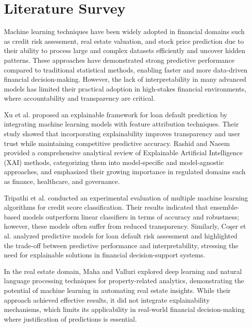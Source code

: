 
\section{Literature Survey}

Machine learning techniques have been widely adopted in financial domains such as credit risk assessment, real estate valuation, and stock price prediction due to their ability to process large and complex datasets efficiently and uncover hidden patterns. These approaches have demonstrated strong predictive performance compared to traditional statistical methods, enabling faster and more data-driven financial decision-making. However, the lack of interpretability in many advanced models has limited their practical adoption in high-stakes financial environments, where accountability and transparency are critical. 

Xu et al. \cite{xu2023} proposed an explainable framework for loan default prediction by integrating machine learning models with feature attribution techniques. Their study showed that incorporating explainability improves transparency and user trust while maintaining competitive predictive accuracy. Rashid and Naeem \cite{rashid2021} provided a comprehensive analytical review of Explainable Artificial Intelligence (XAI) methods, categorizing them into model-specific and model-agnostic approaches, and emphasized their growing importance in regulated domains such as finance, healthcare, and governance. 

Tripathi et al. \cite{tripathi2021} conducted an experimental evaluation of multiple machine learning algorithms for credit score classification. Their results indicated that ensemble-based models outperform linear classifiers in terms of accuracy and robustness; however, these models often suffer from reduced transparency. Similarly, Coşer et al. \cite{coser2019} analyzed predictive models for loan default risk assessment and highlighted the trade-off between predictive performance and interpretability, stressing the need for explainable solutions in financial decision-support systems. 

In the real estate domain, Maha and Valluri \cite{maha2021} explored deep learning and natural language processing techniques for property-related analytics, demonstrating the potential of machine learning in automating real estate insights. While their approach achieved effective results, it did not integrate explainability mechanisms, which limits its applicability in real-world financial decision-making where justification of predictions is essential. 

